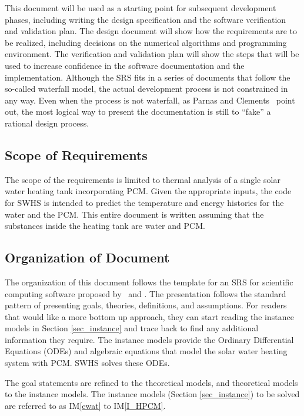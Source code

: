 \documentclass[12pt]{article}
\newcommand{\iref}[1]{IM\ref{#1}}
\newcommand{\progname}{SWHS}
\begin{document}
This document will be used as a starting point for subsequent development
phases, including writing the design specification and the software verification
and validation plan.  The design document will show how the requirements are to
be realized, including decisions on the numerical algorithms and programming
environment.  The verification and validation plan will show the steps that will
be used to increase confidence in the software documentation and the
implementation.  Although the SRS fits in a series of documents that follow the
so-called waterfall model, the actual development process is not constrained in
any way.  Even when the process is not waterfall, as Parnas and
Clements~\cite{ParnasAndClements1986} point out, the most logical way to present
the documentation is still to ``fake'' a rational design process.

\subsection{Scope of Requirements} 

The scope of the requirements is limited to thermal analysis of a single solar
water heating tank incorporating PCM.  Given the appropriate inputs, the code
for \progname{} is intended to predict the temperature and energy histories for
the water and the PCM.  This entire document is written assuming that the
substances inside the heating tank are water and PCM.

\subsection{Organization of Document}

The organization of this document follows the template for an SRS for scientific
computing software proposed by~\cite{Koothoor2013} and \cite{SmithAndLai2005}.
The presentation follows the standard pattern of presenting goals, theories,
definitions, and assumptions.  For readers that would like a more bottom up
approach, they can start reading the instance models in Section
\ref{sec_instance} and trace back to find any additional information they
require.  The instance models provide the Ordinary Differential Equations (ODEs)
and algebraic equations that model the solar water heating system with PCM.
\progname{} solves these ODEs.

The goal statements are refined to the theoretical models, and theoretical
models to the instance models.  The instance models (Section \ref{sec_instance})
to be solved are referred to as \iref{ewat} to \iref{I_HPCM}.
\end{document}
